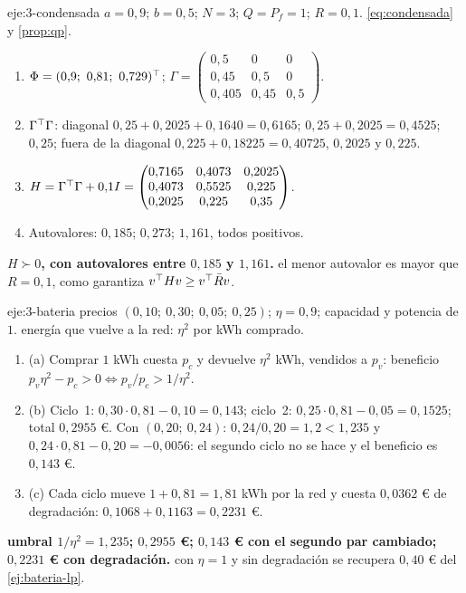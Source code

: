 \begin{solucion}{eje:3-condensada}
\datos $a=0{,}9$; $b=0{,}5$; $N=3$; $Q=P_f=1$; $R=0{,}1$.
\planteamiento \eqref{eq:condensada} y \cref{prop:qp}.
\pasos
\begin{enumerate}[label=\arabic*.]
  \item $\Phi=(0{,}9;\ 0{,}81;\ 0{,}729)\T$; $\Gamma=\begin{pmatrix}0{,}5&0&0\\0{,}45&0{,}5&0\\0{,}405&0{,}45&0{,}5\end{pmatrix}$.
  \item $\Gamma^{\top}\Gamma$: diagonal $0{,}25+0{,}2025+0{,}1640=0{,}6165$; $0{,}25+0{,}2025=0{,}4525$; $0{,}25$; fuera de la diagonal $0{,}225+0{,}18225=0{,}40725$, $0{,}2025$ y $0{,}225$.
  \item $H=\Gamma^{\top}\Gamma+0{,}1I=\begin{pmatrix}0{,}7165&0{,}4073&0{,}2025\\0{,}4073&0{,}5525&0{,}225\\0{,}2025&0{,}225&0{,}35\end{pmatrix}$.
  \item Autovalores: $0{,}185$; $0{,}273$; $1{,}161$, todos positivos.
\end{enumerate}
\resultado \textbf{$H\succ0$, con autovalores entre $0{,}185$ y $1{,}161$.}
\comprobacion el menor autovalor es mayor que $R=0{,}1$, como garantiza $v^{\top} Hv\ge v^{\top}\bar Rv$.
\end{solucion}

\begin{solucion}{eje:3-bateria}
\datos precios $(0{,}10;\ 0{,}30;\ 0{,}05;\ 0{,}25)$; $\eta=0{,}9$; capacidad y potencia de $1$.
\planteamiento energía que vuelve a la red: $\eta^{2}$ por kWh comprado.
\pasos
\begin{enumerate}[label=\arabic*.]
  \item (a) Comprar $1$ kWh cuesta $p_c$ y devuelve $\eta^{2}$ kWh, vendidos a $p_v$: beneficio $p_v\eta^{2}-p_c>0\iff p_v/p_c>1/\eta^{2}$.
  \item (b) Ciclo~1: $0{,}30\cdot0{,}81-0{,}10=0{,}143$; ciclo~2: $0{,}25\cdot0{,}81-0{,}05=0{,}1525$; total $0{,}2955$ €. Con $(0{,}20;\ 0{,}24)$: $0{,}24/0{,}20=1{,}2<1{,}235$ y $0{,}24\cdot0{,}81-0{,}20=-0{,}0056$: el segundo ciclo no se hace y el beneficio es $0{,}143$ €.
  \item (c) Cada ciclo mueve $1+0{,}81=1{,}81$ kWh por la red y cuesta $0{,}0362$ € de degradación: $0{,}1068+0{,}1163=0{,}2231$ €.
\end{enumerate}
\resultado \textbf{umbral $1/\eta^{2}=1{,}235$; $0{,}2955$ €; $0{,}143$ € con el segundo par cambiado; $0{,}2231$ € con degradación.}
\comprobacion con $\eta=1$ y sin degradación se recupera $0{,}40$ € del \cref{ej:bateria-lp}.
\end{solucion}


